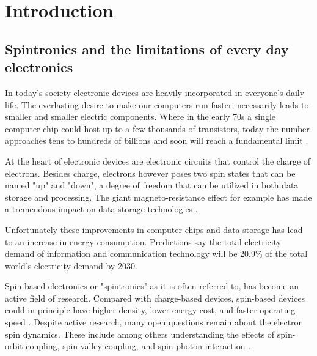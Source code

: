 \chapter{Introduction}\label{ch:introduction}
\section{Spintronics and the limitations of every day electronics}
In today's society electronic devices are heavily incorporated in everyone's daily life. The everlasting desire to make our computers run faster, necessarily leads to smaller and smaller electric components. Where in the early 70s a single computer chip could host up to a few thousands of transistors, today the number approaches tens to hundreds of billions and soon will reach a fundamental limit \cite{mccleanreport}. 

At the heart of electronic devices are electronic circuits that control the charge of electrons. Besides charge, electrons however poses two spin states that can be named "up" and "down", a degree of freedom that can be utilized in both data storage and processing. The giant magneto-resistance effect \cite{binasch_enhanced_1989, baibich_giant_1988} for example has made a tremendous impact on data storage technologies \cite{puebla_spintronic_2020}. 

Unfortunately these improvements in computer chips and data storage has lead to an increase in energy consumption. Predictions say the total electricity demand of information and communication technology will be 20.9\% of the total world's electricity demand \cite{jones_how_2018} by 2030. 

Spin-based electronics or "spintronics" as it is often referred to, has become an active field of research. Compared with charge-based devices, spin-based devices could in principle have higher density, lower energy cost, and faster operating speed \cite{pu_chapter_2020, liu_chapter_2020, book_recent_advancements}. Despite active research, many open questions remain about the electron spin dynamics. These include among others understanding the effects of spin-orbit coupling, spin-valley coupling, and spin-photon interaction \cite{liu_chapter_2020}. 


